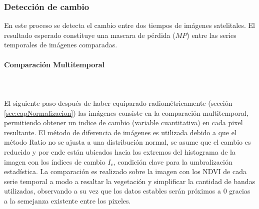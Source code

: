 \subsubsection{Detecci\'on de cambio}
En este proceso se detecta el cambio entre dos tiempos de im\'agenes satelitales. El resultado esperado constituye una mascara de p\'erdida ($ MP $) entre las series temporales de im\'agenes comparadas. 
\paragraph{Comparaci\'on Multitemporal}\mbox{}\\\mbox{}\\
El siguiente paso despu\'es de haber equiparado radiom\'etricamente (secci\'on \ref{sec:capNormalizacion}) las im\'agenes consiste en la comparaci\'on multitemporal, permitiendo obtener un indice de cambio (variable cuantitativa) en cada pixel resultante. El m\'etodo de diferencia de im\'agenes es utilizada debido a que el m\'etodo Ratio no se ajusta a una distribuci\'on normal, se asume que el cambio es reducido y por ende est\'an ubicados hacia los extremos del histograma de la imagen con los \'indices de cambio $ I_{c} $, condici\'on clave para la umbralizaci\'on estad\'istica. La comparaci\'on es realizado sobre la imagen con los NDVI de cada serie temporal a modo a resaltar la vegetaci\'on y simplificar la cantidad de bandas utilizadas, observando a su vez que los datos estables ser\'an pr\'oximos a $ 0 $ gracias a la semejanza existente entre los pixeles. 
